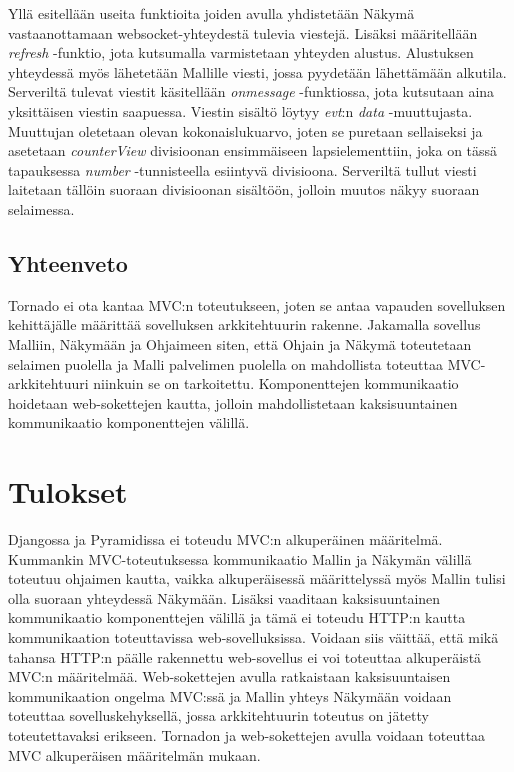 \documentclass[utf8]{gradu3}
\begin{document}
Yllä esitellään useita funktioita joiden avulla yhdistetään Näkymä vastaanottamaan websocket-yhteydestä tulevia viestejä. Lisäksi määritellään \emph{refresh} -funktio, jota kutsumalla varmistetaan yhteyden alustus. Alustuksen yhteydessä myös lähetetään Mallille viesti, jossa pyydetään lähettämään alkutila. Serveriltä tulevat viestit käsitellään \emph{onmessage} -funktiossa, jota kutsutaan aina yksittäisen viestin saapuessa. Viestin sisältö löytyy \emph{evt}:n \emph{data} -muuttujasta. Muuttujan oletetaan olevan kokonaislukuarvo, joten se puretaan sellaiseksi ja asetetaan \emph{counterView} divisioonan ensimmäiseen lapsielementtiin, joka on tässä tapauksessa \emph{number} -tunnisteella esiintyvä divisioona. Serveriltä tullut viesti laitetaan tällöin suoraan divisioonan sisältöön, jolloin muutos näkyy suoraan selaimessa. 

\section{Yhteenveto}
Tornado ei ota kantaa MVC:n toteutukseen, joten se antaa vapauden sovelluksen kehittäjälle määrittää sovelluksen arkkitehtuurin rakenne. Jakamalla sovellus Malliin, Näkymään ja Ohjaimeen siten, että Ohjain ja Näkymä toteutetaan selaimen puolella ja Malli palvelimen puolella on mahdollista toteuttaa MVC-arkkitehtuuri niinkuin se on tarkoitettu. Komponenttejen kommunikaatio hoidetaan web-sokettejen kautta, jolloin mahdollistetaan kaksisuuntainen kommunikaatio komponenttejen välillä. 

\chapter{Tulokset}
Djangossa ja Pyramidissa ei toteudu MVC:n alkuperäinen määritelmä. Kummankin MVC-toteutuksessa kommunikaatio Mallin ja Näkymän välillä toteutuu ohjaimen kautta, vaikka alkuperäisessä määrittelyssä myös Mallin tulisi olla suoraan yhteydessä Näkymään. Lisäksi vaaditaan kaksisuuntainen kommunikaatio komponenttejen välillä ja tämä ei toteudu HTTP:n kautta kommunikaation toteuttavissa web-sovelluksissa. Voidaan siis väittää, että mikä tahansa HTTP:n päälle rakennettu web-sovellus ei voi toteuttaa alkuperäistä MVC:n määritelmää. Web-sokettejen avulla ratkaistaan kaksisuuntaisen kommunikaation ongelma MVC:ssä ja Mallin yhteys Näkymään voidaan toteuttaa sovelluskehyksellä, jossa arkkitehtuurin toteutus on jätetty toteutettavaksi erikseen. Tornadon ja web-sokettejen avulla voidaan toteuttaa MVC alkuperäisen määritelmän mukaan.

\printbibliography
\end{document}
